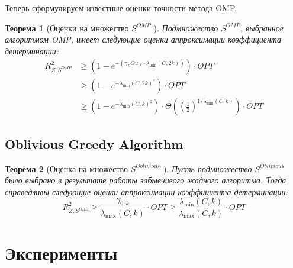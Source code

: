 \documentclass[preprint,12pt]{elsarticle}
\newtheorem{theorem}{Теорема}
\begin{document}
Теперь сформулируем известные оценки точности метода OMP.

\begin{theorem}[Оценки на множество $S^{OMP}$ \cite{das2011submodular}]
Подмножество $S^{OMP}$, выбранное алгоритмом OMP, имеет следующие оценки аппроксимации коэффициента детерминации:
\begin{equation}\begin{aligned}
R_{Z, S^{O M P}}^{2} & \geq\left(1-e^{-\left(\gamma_{S} O u_{, k} \cdot \lambda_{\min }(C, 2 k)\right)}\right) \cdot OPT \\
& \geq\left(1-e^{-\lambda_{\min }(C, 2 k)^{2}}\right) \cdot OPT \\
& \geq\left(1-e^{-\lambda_{\min }(C, k)^{2}}\right) \cdot \Theta\left(\left(\frac{1}{2}\right)^{1 / \lambda_{\min }(C, k)}\right) \cdot OPT
\end{aligned}\end{equation}

\end{theorem}

\subsection{Oblivious Greedy Algorithm}
\begin{theorem}[Оценка на множество $S^{Oblivious}$ \cite{das2011submodular}]
Пусть подмножество $S^{Oblivious}$ было выбрано в результате работы забывчивого жадного алгоритма. Тогда справедливы следующие оценки аппроксимации коэффициента детерминации:
\begin{equation}R_{Z, S^{O B L}}^{2} \geq \frac{\gamma_{0, k}}{\lambda_{\max }(C, k)} \cdot O P T \geq \frac{\lambda_{\min }(C, k)}{\lambda_{\max }(C, k)} \cdot O P T\end{equation}
\end{theorem}
\section{Эксперименты}
\label{S:4}
\end{document}
